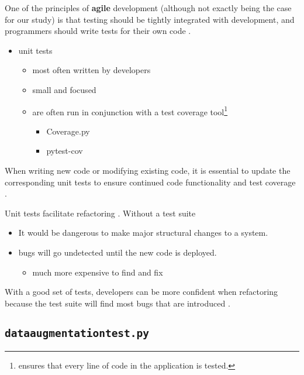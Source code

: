 			One of the principles of \textbf{agile} development (although not exactly being the case for our study) is that testing should be tightly integrated with development, and programmers should write tests for their own code \cite{Ousterhout:2018}.
			
			\begin{itemize}
				\item unit tests
				\begin{itemize}
					\item most often written by developers
					\item small and focused
					\item are often run in conjunction with a test coverage tool\footnote{ensures that every line of code in the application is tested.}
					\begin{itemize}
						\item Coverage.py
						\item pytest-cov
					\end{itemize}
				\end{itemize}
			\end{itemize}
			
			When writing new code or modifying existing code, it is essential to update the corresponding unit tests to ensure continued code functionality and test coverage \cite{Ousterhout:2018}.
			
			Unit tests facilitate refactoring \cite{Ousterhout:2018}. Without a test suite
			
			\begin{itemize}
				\item It would be dangerous to make major structural changes to a system.
				\item bugs will go undetected until the new code is deployed.
				\begin{itemize}
					\item much more expensive to find and fix
				\end{itemize}
			\end{itemize}
			
			With a good set of tests, developers can be more confident when refactoring because the test suite will find most bugs that are introduced \cite{Ousterhout:2018}. 
			
			\subsection{\texttt{dataaugmentationtest.py}}
			
